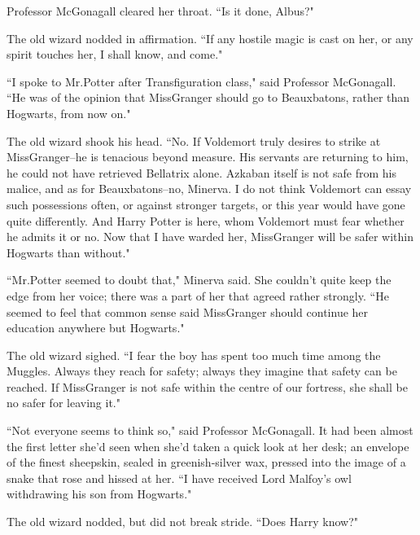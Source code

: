 Professor McGonagall cleared her throat. ``Is it done, Albus?"

The old wizard nodded in affirmation. ``If any hostile magic is cast on her, or any spirit touches her, I shall know, and come."

``I spoke to Mr.\?Potter after Transfiguration class," said Professor McGonagall. ``He was of the opinion that Miss\?Granger should go to Beauxbatons, rather than Hogwarts, from now on."

The old wizard shook his head. ``No. If Voldemort truly desires to strike at Miss\?Granger\---he is tenacious beyond measure. His servants are returning to him, he could not have retrieved Bellatrix alone. Azkaban itself is not safe from his malice, and as for Beauxbatons\---no, Minerva. I do not think Voldemort can essay such possessions often, or against stronger targets, or this year would have gone quite differently. And Harry Potter is here, whom Voldemort must fear whether he admits it or no. Now that I have warded her, Miss\?Granger will be safer within Hogwarts than without."

``Mr.\?Potter seemed to doubt that," Minerva said. She couldn't quite keep the edge from her voice; there was a part of her that agreed rather strongly. ``He seemed to feel that common sense said Miss\?Granger should continue her education anywhere but Hogwarts."

The old wizard sighed. ``I fear the boy has spent too much time among the Muggles. Always they reach for safety; always they imagine that safety can be reached. If Miss\?Granger is not safe within the centre of our fortress, she shall be no safer for leaving it."

``Not everyone seems to think so," said Professor McGonagall. It had been almost the first letter she'd seen when she'd taken a quick look at her desk; an envelope of the finest sheepskin, sealed in greenish-silver wax, pressed into the image of a snake that rose and hissed at her. ``I have received Lord Malfoy's owl withdrawing his son from Hogwarts."

The old wizard nodded, but did not break stride. ``Does Harry know?"

